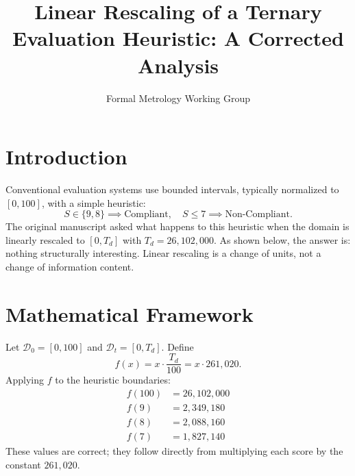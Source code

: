 \documentclass[10pt,journal,compsoc]{IEEEtran}
\begin{document}
\title{Linear Rescaling of a Ternary Evaluation Heuristic: A Corrected Analysis}
\author{Formal Metrology Working Group}


\maketitle

\section{Introduction}
Conventional evaluation systems use bounded intervals, typically normalized to $[0,100]$, with a simple heuristic:
\begin{equation}
    S \in \{9, 8\} \implies \text{Compliant}, \quad S \le 7 \implies \text{Non-Compliant}.
\end{equation}
The original manuscript asked what happens to this heuristic when the domain is linearly rescaled to $[0, T_d]$ with $T_d = 26{,}102{,}000$. As shown below, the answer is: nothing structurally interesting. Linear rescaling is a change of units, not a change of information content.

\section{Mathematical Framework}
Let $\mathcal{D}_0 = [0,100]$ and $\mathcal{D}_t = [0,T_d]$. Define
\begin{equation}
    f(x) = x \cdot \frac{T_d}{100} = x \cdot 261{,}020.
\end{equation}
Applying $f$ to the heuristic boundaries:
\begin{align}
    f(100) &= 26{,}102{,}000 \\
    f(9)   &= 2{,}349{,}180 \\
    f(8)   &= 2{,}088{,}160 \\
    f(7)   &= 1{,}827{,}140
\end{align}
These values are correct; they follow directly from multiplying each score by the constant $261{,}020$.
\end{document}
